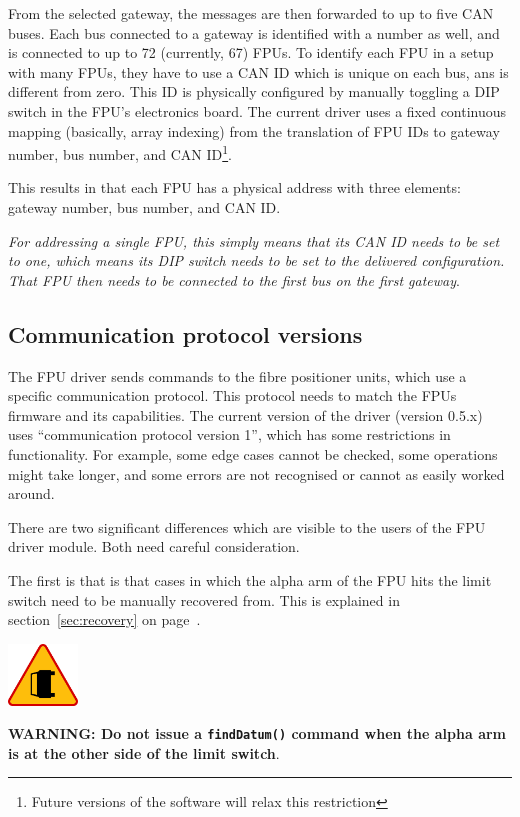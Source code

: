 \documentclass[11pt,a4paper]{report}
\newenvironment{warning}{\begin{framed}\includegraphics[width=5em]{accident-area-ahead.png}
}{\end{framed}}
\begin{document}
From the selected gateway, the messages are then forwarded to up to
five CAN buses. Each bus connected to a gateway is identified with a
number as well, and is connected to up to 72 (currently, 67) FPUs.
 To identify each FPU in a setup with many FPUs,
they have to use a CAN ID which is unique on each bus, ans is
different from zero. This ID is physically configured by manually
toggling a DIP switch in the FPU's electronics board. The current
driver uses a fixed continuous mapping (basically, array indexing)
from the translation of FPU IDs to gateway number, bus number, and CAN
ID\footnote{Future versions of the software will relax this
  restriction}.

This results in that each FPU has a physical address with three
elements: gateway number, bus number, and CAN ID.

\emph{For addressing a single FPU, this simply means that its CAN ID
  needs to be set to one, which means its DIP switch needs to be set
  to the delivered configuration. That FPU then needs to be connected
  to the first bus on the first gateway}.


\subsection{Communication protocol versions}
The FPU driver sends commands to the fibre positioner units, which use
a specific communication protocol. This protocol needs to match the
FPUs firmware and its capabilities. The current version of the driver
(version 0.5.x) uses ``communication protocol version 1'', which has
some restrictions in functionality. For example, some edge cases
cannot be checked, some operations might take longer, and some errors
are not recognised or cannot as easily worked around.

There are two significant differences which are visible to the users
of the FPU driver module. Both need careful consideration.

The first is that is that cases in which the alpha arm of the FPU hits
the limit switch need to be manually recovered from. This is explained
in section~\ref{sec:recovery} on page~\pageref{sec:recovery}.



\begin{warning}
\textbf{WARNING: Do not issue a \texttt{findDatum()} command when the
  alpha arm is at the other side of the limit switch}.
\end{warning}
\end{document}

